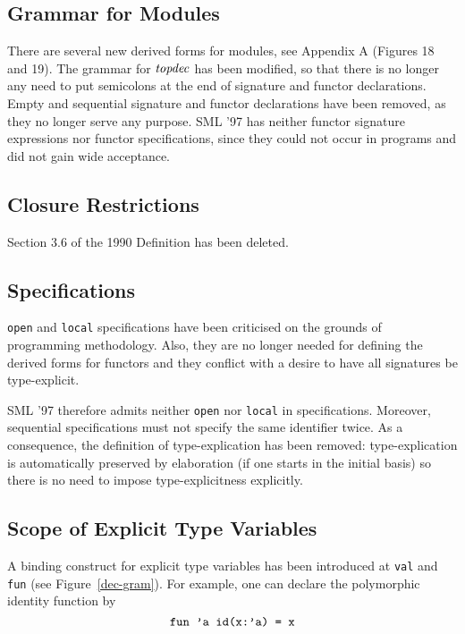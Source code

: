 \subsection{Grammar for Modules}
There are several new derived forms for modules, see Appendix A
(Figures 18 and 19).
The grammar for ${\it topdec}$ has been modified, so that there is no
longer any need to put semicolons at the end of signature and functor
declarations. 
Empty and sequential signature and functor declarations have been removed, as they no
longer serve any purpose.
SML '97 has neither functor signature expressions nor 
functor specifications, since they could not occur in programs
and did not gain wide acceptance. 

\subsection{Closure Restrictions}
Section 3.6 of the 1990 Definition has been deleted.

\subsection{Specifications}
{\tt open} and {\tt local} specifications have been criticised on
the grounds of programming method\-ology\cite{appel93}. Also, they are no longer
needed for defining the derived forms for functors and they conflict
with a desire to have all signatures be type-explicit.

SML '97 therefore admits neither {\tt open} nor {\tt local} in
specifications. Moreover, sequential specifications must not
specify the same identifier twice.
As a consequence, the definition of type-explication
has been removed: type-explication is automatically
preserved by elaboration (if one starts in the initial basis)  so
there is no need to impose type-explicitness explicitly.


\subsection{Scope of Explicit Type Variables}
A binding construct for explicit type variables has been
introduced at {\tt val} and {\tt fun}
(see Figure~\ref{dec-gram}). 
For example,  one can declare the polymorphic
identity function by
$$\hbox{\tt fun 'a id(x:'a) = x}$$


